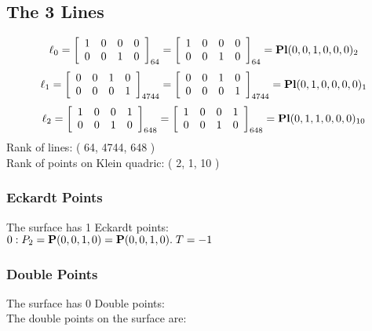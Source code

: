 \documentclass{article}
\newcommand{\bP}{{\bf P}}
\begin{document}
{\subsection*{The 3 Lines}
$$
\ell_{0} = 
\left[
\begin{array}{*{4}{r}}
1 & 0 & 0 & 0\\
0 & 0 & 1 & 0\\
\end{array}
\right]
_{64}
=
\left[
\begin{array}{*{4}c}
1  & 0  & 0  & 0\\
0  & 0  & 1  & 0\\
\end{array}
\right]_{64}
={\rm\bf Pl}(0,0,1,0,0,0 )_{2}$$
$$
\ell_{1} = 
\left[
\begin{array}{*{4}{r}}
0 & 0 & 1 & 0\\
0 & 0 & 0 & 1\\
\end{array}
\right]
_{4744}
=
\left[
\begin{array}{*{4}c}
0  & 0  & 1  & 0\\
0  & 0  & 0  & 1\\
\end{array}
\right]_{4744}
={\rm\bf Pl}(0,1,0,0,0,0 )_{1}$$
$$
\ell_{2} = 
\left[
\begin{array}{*{4}{r}}
1 & 0 & 0 & 1\\
0 & 0 & 1 & 0\\
\end{array}
\right]
_{648}
=
\left[
\begin{array}{*{4}c}
1  & 0  & 0  & 1\\
0  & 0  & 1  & 0\\
\end{array}
\right]_{648}
={\rm\bf Pl}(0,1,1,0,0,0 )_{10}$$
Rank of lines: ( 64, 4744, 648 )\\
Rank of points on Klein quadric: ( 2, 1, 10 )\\
\subsubsection*{Eckardt Points}
The surface has 1 Eckardt points:\\
$0 : P_{2}=\bP(0, 0, 1, 0) = \bP(0, 0, 1, 0).\; T= -1$\\
\subsubsection*{Double Points}
The surface has 0 Double points:\\
The double points on the surface are:\\
\begin{multicols}{2}
\noindent
\end{multicols}
}
\end{document}
